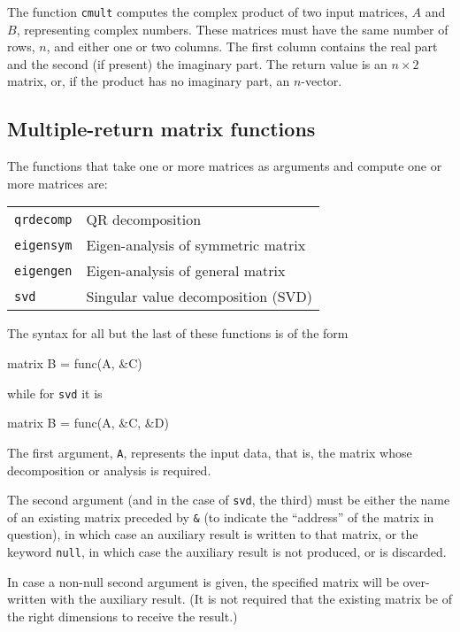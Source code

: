 The function \texttt{cmult} computes the complex product of two input
matrices, $A$ and $B$, representing complex numbers.  These matrices
must have the same number of rows, $n$, and either one or two columns.
The first column contains the real part and the second (if present)
the imaginary part.  The return value is an $n \times 2$ matrix, or,
if the product has no imaginary part, an $n$-vector.


\subsection{Multiple-return matrix functions}
\label{matrix-multiples}

The functions that take one or more matrices as arguments and compute
one or more matrices are:

\begin{center}
\begin{tabular}{ll}
\texttt{qrdecomp} & QR decomposition \\
\texttt{eigensym} & Eigen-analysis of symmetric matrix \\
\texttt{eigengen} & Eigen-analysis of general matrix \\
\texttt{svd}      & Singular value decomposition (SVD) 
\end{tabular}
\end{center}

The syntax for all but the last of these functions is of the form
%
\begin{code}
matrix B = func(A, &C)
\end{code}
%
while for \texttt{svd} it is
%
\begin{code}
matrix B = func(A, &C, &D)
\end{code}
%
The first argument, \texttt{A}, represents the input data, that is,
the matrix whose decomposition or analysis is required.

The second argument (and in the case of \texttt{svd}, the third) must
be either the name of an existing matrix preceded by \verb+&+ (to
indicate the ``address'' of the matrix in question), in which case an
auxiliary result is written to that matrix, or the keyword
\texttt{null}, in which case the auxiliary result is not produced, or
is discarded.

In case a non-null second argument is given, the specified matrix will
be over-written with the auxiliary result.  (It is not required that
the existing matrix be of the right dimensions to receive the result.)

